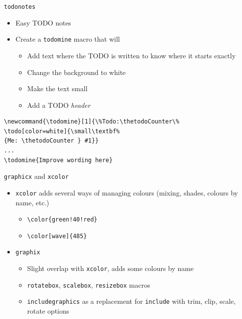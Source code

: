 \documentclass[english]{beamer}
\let\olditem\item
\renewcommand{\item}{\setlength{\itemsep}{\fill}\olditem}
\newenvironment{sitemize}{\let\item\olditem \begin{itemize}}{\vfill\end{itemize}}
\let\textttt\texttt
\renewcommand{\texttt}[1]{\colorbox{gray!10}{\textttt{#1}}}
\begin{document}
\begin{frame}[fragile]{\texttt{todonotes}}
    \begin{itemize}
        \item Easy TODO notes
        \item Create a \texttt{todomine} macro that will
        \begin{sitemize}
            \item Add text where the TODO is written to know where it starts exactly
            \item Change the background to white
            \item Make the text small
            \item Add a TODO \textit{header}
        \end{sitemize}
    \end{itemize}
        \begin{verbatim}
\newcommand{\todomine}[1]{\%Todo:\thetodoCounter\%
\todo[color=white]{\small\textbf%
{Me: \thetodoCounter } #1}}
...
\todomine{Improve wording here}
        \end{verbatim}
\end{frame}

\begin{frame}[fragile]{\texttt{graphicx} and \texttt{xcolor}}
    \begin{itemize}
        \item \texttt{xcolor} adds several ways of managing colours (mixing, shades, colours by name, etc.)
        \begin{sitemize}
            \item {\color{green!40!yellow}  \verb|\color{green!40!red}|}
            \item {\color[wave]{485} \verb|\color[wave]{485}|}
        \end{sitemize} 
        \item \texttt{graphix}        
        \begin{sitemize}
            \item Slight overlap with \texttt{xcolor}, adds some colours by name
            \item \texttt{rotatebox}, \texttt{scalebox}, \texttt{resizebox} macros
            \item \texttt{includegraphics} as a replacement for \texttt{include} with trim, clip, scale, rotate options
        \end{sitemize}
    \end{itemize}
\end{frame}
\end{document}

